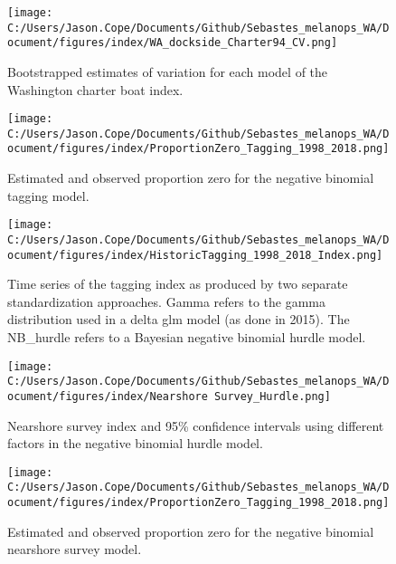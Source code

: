 \documentclass[11pt,
  letterpaper,
]{article}
\begin{document}
\pagebreak

\begin{figure}
{\centering
\texttt{[image: C:/Users/Jason.Cope/Documents/Github/Sebastes\_melanops\_WA/Document/figures/index/WA\_dockside\_Charter94\_CV.png]}
}
\caption{Bootstrapped estimates of variation for each model of the Washington charter boat index.\label{fig:charter-CVs}}
\end{figure}

\pagebreak

\begin{figure}
{\centering
\texttt{[image: C:/Users/Jason.Cope/Documents/Github/Sebastes\_melanops\_WA/Document/figures/index/ProportionZero\_Tagging\_1998\_2018.png]}
}
\caption{Estimated and observed proportion zero for the negative binomial tagging model.\label{fig:prop-zero-tag}}
\end{figure}

\pagebreak

\begin{figure}
{\centering
\texttt{[image: C:/Users/Jason.Cope/Documents/Github/Sebastes\_melanops\_WA/Document/figures/index/HistoricTagging\_1998\_2018\_Index.png]}
}
\caption{Time series of the tagging index as produced by two separate standardization approaches. Gamma refers to the gamma distribution used in a delta glm model (as done in 2015). The NB\_hurdle refers to a Bayesian negative binomial hurdle model.\label{fig:tag-index}}
\end{figure}

\pagebreak

\begin{figure}
{\centering
\texttt{[image: C:/Users/Jason.Cope/Documents/Github/Sebastes\_melanops\_WA/Document/figures/index/Nearshore Survey\_Hurdle.png]}
}
\caption{Nearshore survey index and 95\% confidence intervals using different factors in the negative binomial hurdle model.\label{fig:model-sel-nearshore}}
\end{figure}

\pagebreak

\begin{figure}
{\centering
\texttt{[image: C:/Users/Jason.Cope/Documents/Github/Sebastes\_melanops\_WA/Document/figures/index/ProportionZero\_Tagging\_1998\_2018.png]}
}
\caption{Estimated and observed proportion zero for the negative binomial nearshore survey model.\label{fig:prop-zero-nearshore}}
\end{figure}
\end{document}

